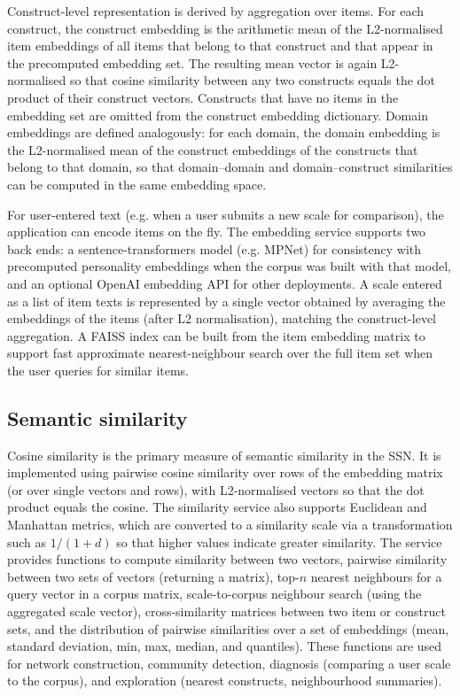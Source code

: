 \documentclass[11pt]{article}
\begin{document}
Construct-level representation is derived by aggregation over items. For each construct, the construct embedding is the arithmetic mean of the L2-normalised item embeddings of all items that belong to that construct and that appear in the precomputed embedding set. The resulting mean vector is again L2-normalised so that cosine similarity between any two constructs equals the dot product of their construct vectors. Constructs that have no items in the embedding set are omitted from the construct embedding dictionary. Domain embeddings are defined analogously: for each domain, the domain embedding is the L2-normalised mean of the construct embeddings of the constructs that belong to that domain, so that domain--domain and domain--construct similarities can be computed in the same embedding space.

For user-entered text (e.g. when a user submits a new scale for comparison), the application can encode items on the fly. The embedding service supports two back ends: a sentence-transformers model (e.g. MPNet) for consistency with precomputed personality embeddings when the corpus was built with that model, and an optional OpenAI embedding API for other deployments. A scale entered as a list of item texts is represented by a single vector obtained by averaging the embeddings of the items (after L2 normalisation), matching the construct-level aggregation. A FAISS index can be built from the item embedding matrix to support fast approximate nearest-neighbour search over the full item set when the user queries for similar items.

\subsection{Semantic similarity}

Cosine similarity is the primary measure of semantic similarity in the SSN. It is implemented using pairwise cosine similarity over rows of the embedding matrix (or over single vectors and rows), with L2-normalised vectors so that the dot product equals the cosine. The similarity service also supports Euclidean and Manhattan metrics, which are converted to a similarity scale via a transformation such as $1/(1+d)$ so that higher values indicate greater similarity. The service provides functions to compute similarity between two vectors, pairwise similarity between two sets of vectors (returning a matrix), top-$n$ nearest neighbours for a query vector in a corpus matrix, scale-to-corpus neighbour search (using the aggregated scale vector), cross-similarity matrices between two item or construct sets, and the distribution of pairwise similarities over a set of embeddings (mean, standard deviation, min, max, median, and quantiles). These functions are used for network construction, community detection, diagnosis (comparing a user scale to the corpus), and exploration (nearest constructs, neighbourhood summaries).
\end{document}
